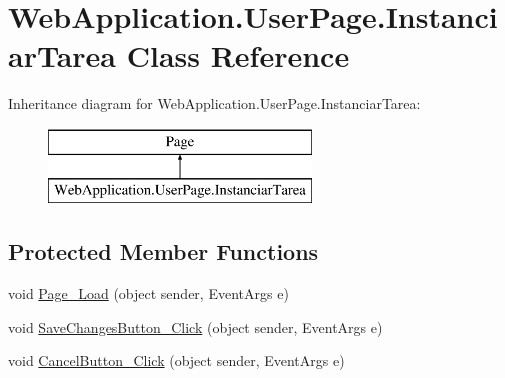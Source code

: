 \hypertarget{classWebApplication_1_1UserPage_1_1InstanciarTarea}{}\section{Web\+Application.\+User\+Page.\+Instanciar\+Tarea Class Reference}
\label{classWebApplication_1_1UserPage_1_1InstanciarTarea}
Inheritance diagram for Web\+Application.\+User\+Page.\+Instanciar\+Tarea\+:\begin{figure}[H]
\begin{center}
\leavevmode
\includegraphics[height=2.000000cm]{d8/dfd/classWebApplication_1_1UserPage_1_1InstanciarTarea}
\end{center}
\end{figure}
\subsection*{Protected Member Functions}
\begin{DoxyCompactItemize}
\item 
void \mbox{\hyperlink{classWebApplication_1_1UserPage_1_1InstanciarTarea_afd68741b2820aa5498ccd334a06b77c2}{Page\+\_\+\+Load}} (object sender, Event\+Args e)
\item 
void \mbox{\hyperlink{classWebApplication_1_1UserPage_1_1InstanciarTarea_ab14407ac43c6b4b4b8876129e0a96e89}{Save\+Changes\+Button\+\_\+\+Click}} (object sender, Event\+Args e)
\item 
void \mbox{\hyperlink{classWebApplication_1_1UserPage_1_1InstanciarTarea_a852ce4236f997230e5bea7ece9cb0f06}{Cancel\+Button\+\_\+\+Click}} (object sender, Event\+Args e)
\end{DoxyCompactItemize}
